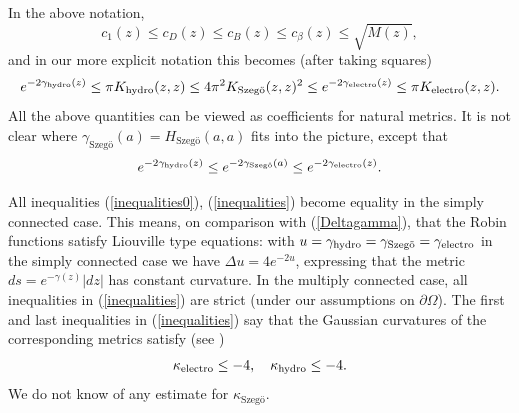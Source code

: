 \documentclass[reqno,12pt]{article}
\theoremstyle{plain}
\theoremstyle{definition}
\numberwithin{equation}{section}
\numberwithin{figure}{section}
\begin{document}
In the above notation,
\begin{equation}\label{inequalities0}
c_1(z)\leq c_D(z)\leq c_B(z)\leq c_\beta (z)\leq \sqrt{M(z)},
\end{equation}
and in our more explicit notation this becomes (after taking squares)
\begin{equation}\label{inequalities}
e^{-2\gamma_{\rm hydro}(z)}\leq \pi {K_{\rm hydro}}(z,z)\leq 4\pi^2 K_\text{Szeg\"o}(z,z)^2\leq e^{-2\gamma_{\rm electro}(z)}\leq\pi K_{\rm electro}(z,z).
\end{equation}
All the above quantities can be viewed as coefficients for natural metrics.
It is not clear where ${\gamma_\text{Szeg\"o}}(a)=H_{\text{Szeg\"{o}}}(a,a)$ fits into the picture, except that
$$
e^{-2\gamma_{\rm hydro}(z)}\leq e^{-2{\gamma_\text{Szeg\"o}}(a)}\leq e^{-2\gamma_{\rm electro}(z)}. 
$$

All inequalities (\ref{inequalities0}), (\ref{inequalities}) become equality in the simply connected case. 
This means, on comparison with (\ref{Deltagamma}), 
that the Robin functions satisfy Liouville type equations: with 
$u=\gamma_{\rm hydro}=\gamma_\text{Szeg\"o}=\gamma_{\rm electro}$ in the simply connected case
we have $\Delta u=4e^{-2u}$, expressing that the metric $ds=e^{-\gamma(z)}|dz|$ has constant curvature. 
In the multiply connected case, all inequalities in (\ref{inequalities}) are strict  (under our assumptions on $\partial\Omega$). 
The first and last inequalities in (\ref{inequalities}) say that the Gaussian curvatures  of the corresponding metrics satisfy 
(see \cite{Sario-Oikawa-1969})
\begin{equation}\label{estimateskappa}
\kappa_{\rm electro}\leq -4, \quad {\kappa_{\rm hydro}}\leq -4.
\end{equation}
We do not know of any estimate for ${\kappa_\text{Szeg\"o}}$. 
\end{document}
